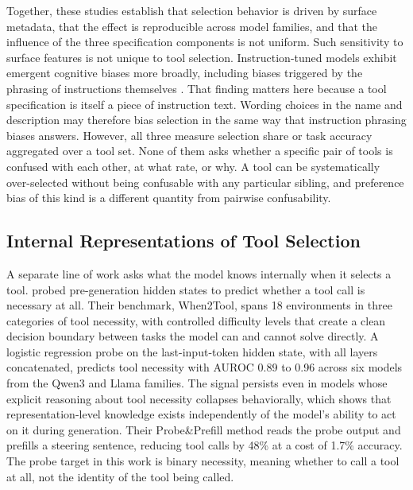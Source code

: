 Together, these studies establish that selection behavior is driven by surface metadata, that the effect is reproducible across model families, and that the influence of the three specification components is not uniform.
Such sensitivity to surface features is not unique to tool selection. Instruction-tuned models exhibit emergent cognitive biases more broadly, including biases triggered by the phrasing of instructions themselves \cite{itzhak2024instructed}.
That finding matters here because a tool specification is itself a piece of instruction text. Wording choices in the name and description may therefore bias selection in the same way that instruction phrasing biases answers.
However, all three measure selection share or task accuracy aggregated over a tool set.
None of them asks whether a specific pair of tools is confused with each other, at what rate, or why.
A tool can be systematically over-selected without being confusable with any particular sibling, and preference bias of this kind is a different quantity from pairwise confusability.

\subsection{Internal Representations of Tool Selection}

A separate line of work asks what the model knows internally when it selects a tool.
\textcite{sun2026when2tool} probed pre-generation hidden states to predict whether a tool call is necessary at all.
Their benchmark, When2Tool, spans 18 environments in three categories of tool necessity, with controlled difficulty levels that create a clean decision boundary between tasks the model can and cannot solve directly.
A logistic regression probe on the last-input-token hidden state, with all layers concatenated, predicts tool necessity with AUROC 0.89 to 0.96 across six models from the Qwen3 and Llama families.
The signal persists even in models whose explicit reasoning about tool necessity collapses behaviorally, which shows that representation-level knowledge exists independently of the model's ability to act on it during generation.
Their Probe\&Prefill method reads the probe output and prefills a steering sentence, reducing tool calls by 48\% at a cost of 1.7\% accuracy.
The probe target in this work is binary necessity, meaning whether to call a tool at all, not the identity of the tool being called.
\\

